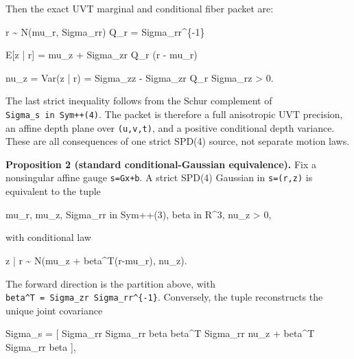 \documentclass[
]{article}
\newenvironment{Shaded}{}{}
\newcommand{\NormalTok}[1]{#1}
\begin{document}
Then the exact UVT marginal and conditional fiber packet are:

\begin{Shaded}
\begin{Highlighting}[]
\NormalTok{r \textasciitilde{} N(mu\_r, Sigma\_rr)}
\NormalTok{Q\_r = Sigma\_rr\^{}\{{-}1\}}

\NormalTok{E[z | r]}
\NormalTok{  = mu\_z + Sigma\_zr Q\_r (r {-} mu\_r)}

\NormalTok{nu\_z = Var(z | r)}
\NormalTok{  = Sigma\_zz {-} Sigma\_zr Q\_r Sigma\_rz \textgreater{} 0.}
\end{Highlighting}
\end{Shaded}

The last strict inequality follows from the Schur complement of
\texttt{Sigma\_s\ in\ Sym++(4)}. The packet is therefore a full
anisotropic UVT precision, an affine depth plane over \texttt{(u,v,t)},
and a positive conditional depth variance. These are all consequences of
one strict SPD(4) source, not separate motion laws.

\textbf{Proposition 2 (standard conditional-Gaussian equivalence).} Fix
a nonsingular affine gauge \texttt{s=Gx+b}. A strict SPD(4) Gaussian in
\texttt{s=(r,z)} is equivalent to the tuple

\begin{Shaded}
\begin{Highlighting}[]
\NormalTok{mu\_r, mu\_z,}
\NormalTok{Sigma\_rr in Sym++(3),}
\NormalTok{beta in R\^{}3,}
\NormalTok{nu\_z \textgreater{} 0,}
\end{Highlighting}
\end{Shaded}

with conditional law

\begin{Shaded}
\begin{Highlighting}[]
\NormalTok{z | r \textasciitilde{} N(mu\_z + beta\^{}T(r{-}mu\_r), nu\_z).}
\end{Highlighting}
\end{Shaded}

The forward direction is the partition above, with
\texttt{beta\^{}T\ =\ Sigma\_zr\ Sigma\_rr\^{}\{-1\}}. Conversely, the
tuple reconstructs the unique joint covariance

\begin{Shaded}
\begin{Highlighting}[]
\NormalTok{Sigma\_s =}
\NormalTok{  [ Sigma\_rr             Sigma\_rr beta}
\NormalTok{    beta\^{}T Sigma\_rr      nu\_z + beta\^{}T Sigma\_rr beta ],}
\end{Highlighting}
\end{Shaded}
\end{document}
